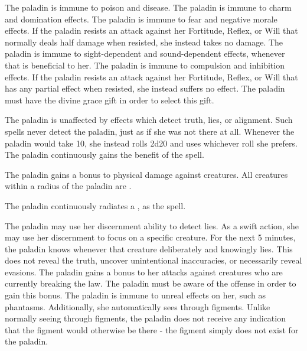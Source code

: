  The paladin is immune to poison and disease.
 The paladin is immune to charm and domination effects.
 The paladin is immune to fear and negative morale effects.
 If the paladin resists an attack against her Fortitude, Reflex, or Will that normally deals half damage when resisted, she instead takes no damage.
 The paladin is immune to sight-dependent and sound-dependent effects, whenever that is beneficial to her.
 The paladin is immune to compulsion and inhibition effects.
 If the paladin resists an attack against her Fortitude, Reflex, or Will that has any partial effect when resisted, she instead suffers no effect. The paladin must have the divine grace gift in order to select this gift.

 The paladin is unaffected by effects which detect truth, lies, or alignment. Such spells never detect the paladin, just as if she was not there at all.
 Whenever the paladin would take 10, she instead rolls 2d20 and uses whichever roll she prefers.
 The paladin continuously gains the benefit of the  spell.

 The paladin gains a  bonus to physical damage against \bloodied creatures.
 All creatures within a \areamed radius of the paladin are \vulnerable.

 The paladin continuously radiates a , as the spell.

 The paladin may use her discernment ability to detect lies. As a swift action, she may use her discernment to focus on a specific creature. For the next 5 minutes, the paladin knows whenever that creature deliberately and knowingly lies. This does not reveal the truth, uncover unintentional inaccuracies, or necessarily reveal evasions.
 The paladin gains a  bonus to her attacks against creatures who are currently breaking the law. The paladin must be aware of the offense in order to gain this bonus.
 The paladin is immune to unreal effects on her, such as phantasms. Additionally, she automatically sees through figments. Unlike normally seeing through figments, the paladin does not receive any indication that the figment would otherwise be there - the figment simply does not exist for the paladin.

